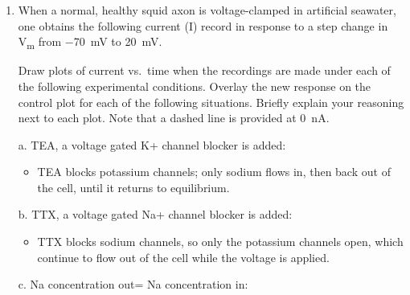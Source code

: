 \documentclass[plain,worksheet]{inVerba-notes}
\begin{document}
\begin{enumerate}[resume]
    \item When a normal, healthy squid axon is voltage-clamped in artificial seawater, one obtains the following current (I) record in response to a step change in \si{V_m} from \SI{-70}{mV} to \SI{+20}{mV}.
    
    \bigskip
    \begin{center}
        
    \end{center}

    Draw plots of current vs.\ time when the recordings are made under each of the following experimental conditions.  Overlay the new response on the control plot for each of the following situations. Briefly explain your reasoning next to each plot. Note that a dashed line is provided at \SI{0}{nA}. 
    
    \item[a.] TEA, a voltage gated K+ channel blocker is added:
    
    \bigskip
    \begin{center}
        
    \end{center}
    \begin{itemize}
        \item TEA blocks potassium channels; only sodium flows in, then back out of the cell, until it returns to equilibrium.
    \end{itemize}
    \newpage
    \item[b.] TTX, a voltage gated Na+ channel blocker is added:
    
    \bigskip
    \bigskip
    \begin{center}
        
    \end{center}
    
    \begin{itemize}
        \item TTX blocks sodium channels, so only the potassium channels open, which continue to flow out of the cell while the voltage is applied.
    \end{itemize}

    \item[c.] Na concentration out= Na concentration in:
    
    \bigskip
    \bigskip
    \begin{center}
        
    \end{center}
    

\end{enumerate}
\end{document}
